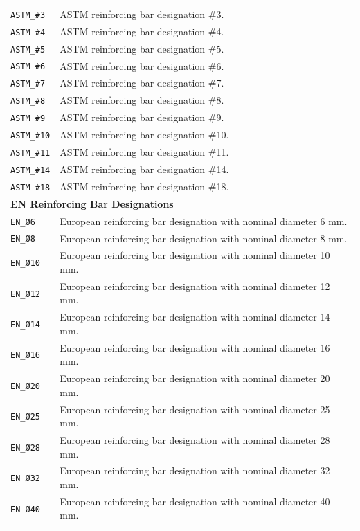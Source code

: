\documentclass[11pt]{book}
\begin{document}
{\begin{longtable}{p{}p{}}
\texttt{ASTM\_\#3} & ASTM reinforcing bar designation \#3. \\
\texttt{ASTM\_\#4} & ASTM reinforcing bar designation \#4. \\
\texttt{ASTM\_\#5} & ASTM reinforcing bar designation \#5. \\
\texttt{ASTM\_\#6} & ASTM reinforcing bar designation \#6. \\
\texttt{ASTM\_\#7} & ASTM reinforcing bar designation \#7. \\
\texttt{ASTM\_\#8} & ASTM reinforcing bar designation \#8. \\
\texttt{ASTM\_\#9} & ASTM reinforcing bar designation \#9. \\
\texttt{ASTM\_\#10} & ASTM reinforcing bar designation \#10. \\
\texttt{ASTM\_\#11} & ASTM reinforcing bar designation \#11. \\
\texttt{ASTM\_\#14} & ASTM reinforcing bar designation \#14. \\
\texttt{ASTM\_\#18} & ASTM reinforcing bar designation \#18. \\

\hline
\multicolumn{2}{l}{\textbf{EN Reinforcing Bar Designations}}\\
\hline

\texttt{EN\_Ø6} & European reinforcing bar designation with nominal diameter 6 mm. \\
\texttt{EN\_Ø8} & European reinforcing bar designation with nominal diameter 8 mm. \\
\texttt{EN\_Ø10} & European reinforcing bar designation with nominal diameter 10 mm. \\
\texttt{EN\_Ø12} & European reinforcing bar designation with nominal diameter 12 mm. \\
\texttt{EN\_Ø14} & European reinforcing bar designation with nominal diameter 14 mm. \\
\texttt{EN\_Ø16} & European reinforcing bar designation with nominal diameter 16 mm. \\
\texttt{EN\_Ø20} & European reinforcing bar designation with nominal diameter 20 mm. \\
\texttt{EN\_Ø25} & European reinforcing bar designation with nominal diameter 25 mm. \\
\texttt{EN\_Ø28} & European reinforcing bar designation with nominal diameter 28 mm. \\
\texttt{EN\_Ø32} & European reinforcing bar designation with nominal diameter 32 mm. \\
\texttt{EN\_Ø40} & European reinforcing bar designation with nominal diameter 40 mm. \\


\end{longtable}}
\end{document}

